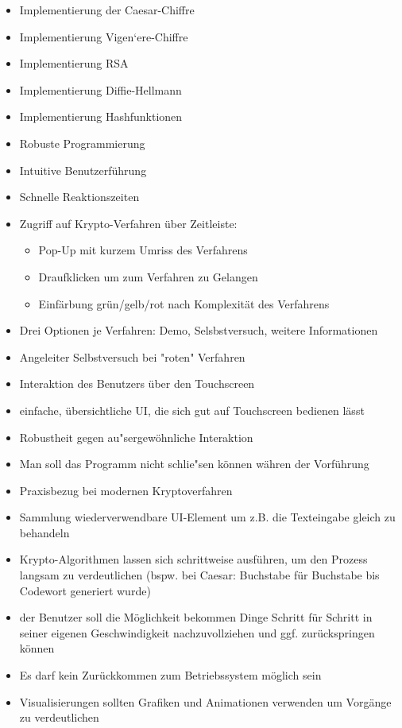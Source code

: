 \documentclass{article}
\begin{document}
\begin{itemize}
    \item Implementierung der Caesar-Chiffre
    \item Implementierung Vigen`ere-Chiffre
    \item Implementierung RSA
    \item Implementierung Diffie-Hellmann
    \item Implementierung Hashfunktionen
    \item Robuste Programmierung
    \item Intuitive Benutzerführung
    \item Schnelle Reaktionszeiten
    \item Zugriff auf Krypto-Verfahren über Zeitleiste:
        \begin{itemize}
            \item Pop-Up mit kurzem Umriss des Verfahrens
            \item Draufklicken um zum Verfahren zu Gelangen
            \item Einfärbung grün/gelb/rot nach Komplexität des Verfahrens
        \end{itemize}
    \item Drei Optionen je Verfahren: Demo, Selsbstversuch, weitere Informationen
    \item Angeleiter Selbstversuch bei "roten" Verfahren
    \item Interaktion des Benutzers über den Touchscreen
    \item einfache, übersichtliche UI, die sich gut auf Touchscreen bedienen lässt
    \item Robustheit gegen au"sergewöhnliche Interaktion
    \item Man soll das Programm nicht schlie"sen können währen der Vorführung
    \item Praxisbezug bei modernen Kryptoverfahren
    \item Sammlung wiederverwendbare UI-Element um z.B. die Texteingabe gleich
        zu behandeln
    \item Krypto-Algorithmen lassen sich schrittweise ausführen, um den Prozess
        langsam zu verdeutlichen (bspw. bei Caesar: Buchstabe für Buchstabe
        bis Codewort generiert wurde)
    \item der Benutzer soll die Möglichkeit bekommen Dinge Schritt für Schritt
        in seiner eigenen Geschwindigkeit nachzuvollziehen und ggf.
        zurückspringen können

    \item Es darf kein Zurückkommen zum Betriebssystem möglich sein
    \item Visualisierungen sollten Grafiken und Animationen verwenden um Vorgänge zu verdeutlichen
\end{itemize}
\end{document}
